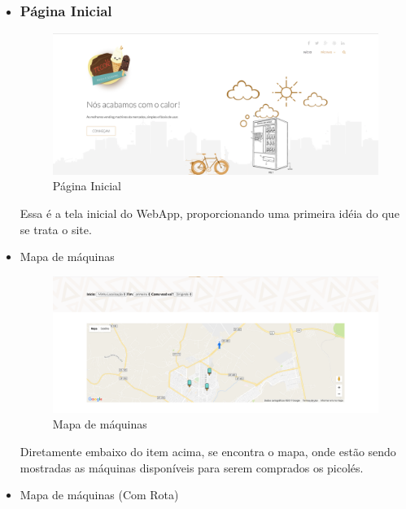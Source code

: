 \begin{itemize}
\item

\subsubsection{Página Inicial}

\begin{figure}[H]
	\centering
    \includegraphics[width=\textwidth]{figuras/inicio}
    \caption{Página Inicial}
    \label{fig:Página Inicial}
\end{figure}

Essa é a tela inicial do WebApp, proporcionando uma primeira idéia do que se trata o site.

\item{Mapa de máquinas}

\begin{figure}[H]
	\centering
    \includegraphics[width=\textwidth]{figuras/map}
    \caption{Mapa de máquinas}
    \label{fig:Mapa de máquinas}
\end{figure}

Diretamente embaixo do item acima, se encontra o mapa, onde estão sendo mostradas as máquinas disponíveis para serem comprados os picolés.

\item{Mapa de máquinas (Com Rota)}


\end{itemize}
